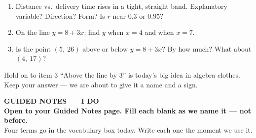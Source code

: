\documentclass[aspectratio=169, 11pt]{beamer}
\begin{document}
\begin{frame}[t, plain]
  \begin{enumerate}\setlength{\itemsep}{8pt}
    \item Distance vs.\ delivery time rises in a tight, straight band. Explanatory variable?
          Direction? Form? Is $r$ near $0.3$ or $0.95$?
    \item On the line $y = 8 + 3x$: find $y$ when $x = 4$ and when $x = 7$.
    \item Is the point $(5,\ 26)$ above or below $y = 8 + 3x$? By how much? What about
          $(4,\ 17)$?
  \end{enumerate}
  \begin{block}{Hold on to item 3}
    ``Above the line by 3'' is today's big idea in algebra clothes. Keep your answer ---
    we are about to give it a name and a sign.
  \end{block}
\end{frame}

{
\begin{frame}[plain]
  \vspace{1.8cm}\hspace{0.8cm}%
  \begin{minipage}{0.86\textwidth}
    {\color{goldacc}\bfseries\small GUIDED NOTES \ \textbullet\ \ I DO}\\[0.7cm]
    {\color{white}\bfseries\Large Open to your Guided Notes page. Fill each blank as we
    name it --- not before.}\\[0.9cm]
    {\color{skymid}\small Four terms go in the vocabulary box today. Write each one the
    moment we use it.}
  \end{minipage}
\end{frame}
}
\end{document}
